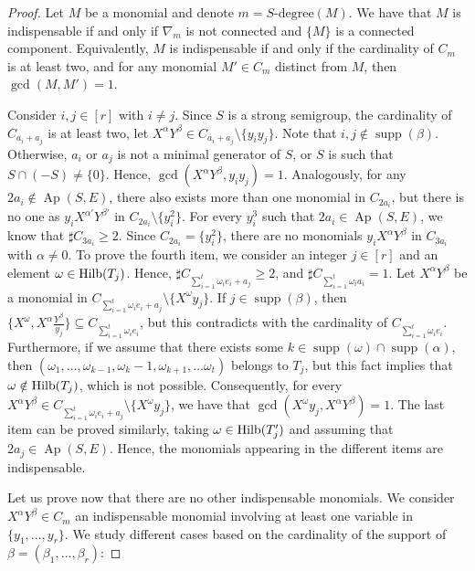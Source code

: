\documentclass[a4paper,11pt]{article}
\def\Ap{\operatorname{Ap}}
\def\supp{\operatorname{supp}}
\begin{document}
{\begin{proof}
Let $M$ be a monomial and denote $m = S\text{-degree}(M)$. We have that $M$ is indispensable if and only if $\nabla_m$ is not connected and $\{M\}$ is a connected component. Equivalently, $M$ is indispensable if and only if the cardinality of $C_{m}$ is at least two, and for any monomial $M' \in C_m$ distinct from $M$, then $\gcd(M, M') = 1$.

Consider $i,j\in [r]$ with $i\neq j$. Since $S$ is a strong semigroup, the cardinality of $C_{a_i+a_j}$ is at least two, let $X^\alpha Y^\beta \in C_{a_i+a_j}\setminus\{y_iy_j\}$. Note that $i,j\notin \supp (\beta)$. Otherwise, $a_i$ or $a_j$ is not a minimal generator of $S$, or $S$ is such that $S\cap (-S)\neq \{0\}$. Hence, $\gcd(X^\alpha Y^\beta,y_iy_j) = 1$.
Analogously, for any $2a_i\notin\Ap(S,E)$, there also exists more than one monomial in $C_{2a_i}$, but there is no one as $y_iX^{\alpha'} Y^{\beta'}$ in $C_{2a_i}\setminus\{y_i^2\}$.
For every $y_i^3$ such that $2a_i \in \Ap (S,E)$, we know that $\sharp C_{3a_i} \ge 2$. Since $C_{2a_i}=\{y_i^2\}$, there are no monomials $y_iX^\alpha Y^\beta$ in $C_{3a_i}$ with $\alpha\neq 0$.
To prove the fourth item, we consider an integer $j\in [r]$ and an element $\omega \in {\rm Hilb} (T_j)$. Hence, $\sharp C_{\sum_{i=1}^t \omega_i e_i+a_j}\ge 2$, and $\sharp C_{\sum_{i=1}^t \omega_i a_i}=1$. Let $X^\alpha Y^\beta$ be a monomial in $C_{\sum_{i=1}^t \omega_i e_i+a_j}\setminus \{X^\omega y_j\}$. If $j \in \supp(\beta)$, then $\{X^\omega,X^\alpha \frac{Y^\beta}{y_j}\}\subseteq C_{\sum_{i=1}^t \omega_i e_i}$, but this contradicts with the cardinality of $C_{\sum_{i=1}^t \omega_i e_i}$. Furthermore, if we assume that there exists some $k\in \supp(\omega)\cap \supp(\alpha)$, then $(\omega_1,\ldots, \omega_{k-1},\omega_{k}-1,\omega_{k+1},\ldots \omega_t)$ belongs to $T_j$, but this fact implies that $\omega \notin {\rm Hilb} (T_j)$, which is not possible. Consequently, for every $X^\alpha Y^\beta \in C_{\sum_{i=1}^t \omega_i e_i+a_j}\setminus \{X^\omega y_j\}$, we have that $\gcd(X^\omega y_j,X^\alpha Y^\beta) = 1$. The last item can be proved similarly, taking $\omega \in {\rm Hilb} (T'_j)$ and assuming that $2a_j\in\Ap(S,E)$. Hence, the monomials appearing in the different items are indispensable.

Let us prove now that there are no other indispensable monomials. We consider $X^\alpha Y^\beta \in C_m$ an indispensable monomial  involving at least one variable in $\{y_1,\ldots,y_r\}$. We study different cases based on the cardinality of the support of $\beta=(\beta_1,\ldots,\beta_r)$:


\end{proof}}
\end{document}
